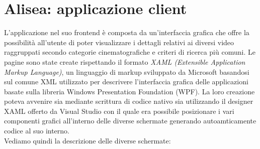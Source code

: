 \documentclass[a4]{book}
\begin{document}
\section{Alisea: applicazione client}
L'applicazione nel suo frontend è composta da un'interfaccia grafica che offre la possibilità all'utente di poter visualizzare i dettagli relativi ai diversi video raggruppati secondo categorie cinematografiche e criteri di ricerca più comuni. Le pagine sono state create rispettando il formato \textit{XAML (Extensible Application Markup Language)}, un linguaggio di markup sviluppato da Microsoft basandosi sul comune XML utilizzato per descrivere l'interfaccia grafica delle applicazioni basate sulla libreria Windows Presentation Foundation (WPF). La loro creazione poteva avvenire sia mediante scrittura di codice nativo sia utilizzando il designer XAML offerto da Visual Studio con il quale era possibile posizionare i vari componenti grafici all'interno delle diverse schermate generando autoamticamente codice al suo interno. \\
Vediamo quindi la descrizione delle diverse schermate:
\end{document}
